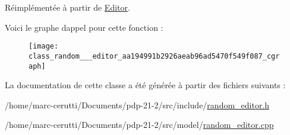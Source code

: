 Réimplémentée à partir de \hyperlink{class_editor_a5747cd74b71d67f6d39b094071058382}{Editor}.

Voici le graphe d\textquotesingle{}appel pour cette fonction \+:\nopagebreak
\begin{figure}[H]
\begin{center}
\leavevmode
\texttt{[image: class\_random\_\_\_editor\_aa194991b2926aeab96ad5470f549f087\_cgraph]}
\end{center}
\end{figure}


La documentation de cette classe a été générée à partir des fichiers suivants \+:\begin{DoxyCompactItemize}
\item 
/home/marc-\/cerutti/\+Documents/pdp-\/21-\/2/src/include/\hyperlink{random__editor_8h}{random\+\_\+editor.\+h}\item 
/home/marc-\/cerutti/\+Documents/pdp-\/21-\/2/src/model/\hyperlink{random__editor_8cpp}{random\+\_\+editor.\+cpp}\end{DoxyCompactItemize}
